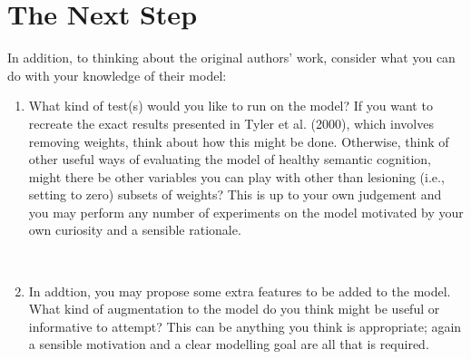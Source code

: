 \documentclass[a4paper,10pt]{article}
\begin{document}
\section{The Next Step}
In addition, to thinking about the original authors' work, consider what you can do with your knowledge of their model: 
\begin{enumerate}


 \item What kind of test(s) would you like to run on the model? If you want to recreate the exact results presented in Tyler et al. (2000), which involves removing weights, think about how this might be done. Otherwise, think of other useful ways of evaluating the model of healthy semantic cognition, might there be other variables you can play with other than lesioning (i.e., setting to zero) subsets of weights? This is up to your own judgement and you may perform any number of  experiments on the model motivated by your own curiosity and a sensible rationale. 
 
\ \\

\item In addtion, you may propose some extra features to be added to the model. What kind of augmentation to the model do you think might be useful or informative to attempt? This can be anything you think is appropriate; again a sensible motivation and a clear modelling goal are all that is required.
\end{enumerate}
\end{document}
